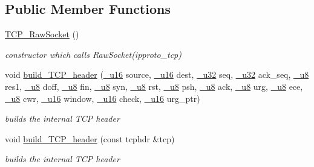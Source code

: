 \subsection*{Public Member Functions}
\begin{CompactItemize}
\item 
\hyperlink{classsocketpp_1_1TCP__RawSocket_f0b76c8fdc293bb5e22914b247b1e7b8}{TCP\_\-RawSocket} ()
\begin{CompactList}\small\item\em constructor which calls RawSocket(ipproto\_\-tcp) \item\end{CompactList}\item 
void \hyperlink{classsocketpp_1_1TCP__RawSocket_443f8b89224427ae95d22b9b305a4990}{build\_\-TCP\_\-header} (\hyperlink{namespacesocketpp_0d48e817f00cbb84d07faec41ee4b169}{\_\-u16} source, \hyperlink{namespacesocketpp_0d48e817f00cbb84d07faec41ee4b169}{\_\-u16} dest, \hyperlink{namespacesocketpp_d9c3b2ad093bb5814af59760e0a2192a}{\_\-u32} seq, \hyperlink{namespacesocketpp_d9c3b2ad093bb5814af59760e0a2192a}{\_\-u32} ack\_\-seq, \hyperlink{namespacesocketpp_1398da7d8125cdb32e89041e5b0adb96}{\_\-u8} res1, \hyperlink{namespacesocketpp_1398da7d8125cdb32e89041e5b0adb96}{\_\-u8} doff, \hyperlink{namespacesocketpp_1398da7d8125cdb32e89041e5b0adb96}{\_\-u8} fin, \hyperlink{namespacesocketpp_1398da7d8125cdb32e89041e5b0adb96}{\_\-u8} syn, \hyperlink{namespacesocketpp_1398da7d8125cdb32e89041e5b0adb96}{\_\-u8} rst, \hyperlink{namespacesocketpp_1398da7d8125cdb32e89041e5b0adb96}{\_\-u8} psh, \hyperlink{namespacesocketpp_1398da7d8125cdb32e89041e5b0adb96}{\_\-u8} ack, \hyperlink{namespacesocketpp_1398da7d8125cdb32e89041e5b0adb96}{\_\-u8} urg, \hyperlink{namespacesocketpp_1398da7d8125cdb32e89041e5b0adb96}{\_\-u8} ece, \hyperlink{namespacesocketpp_1398da7d8125cdb32e89041e5b0adb96}{\_\-u8} cwr, \hyperlink{namespacesocketpp_0d48e817f00cbb84d07faec41ee4b169}{\_\-u16} window, \hyperlink{namespacesocketpp_0d48e817f00cbb84d07faec41ee4b169}{\_\-u16} check, \hyperlink{namespacesocketpp_0d48e817f00cbb84d07faec41ee4b169}{\_\-u16} urg\_\-ptr)
\begin{CompactList}\small\item\em builds the internal TCP header \item\end{CompactList}\item 
void \hyperlink{classsocketpp_1_1TCP__RawSocket_8c35edfc4d8c2fbccf0fe13485dd2ef1}{build\_\-TCP\_\-header} (const tcphdr \&tcp)
\begin{CompactList}\small\item\em builds the internal TCP header \item\end{CompactList}\item 

\end{CompactItemize}
